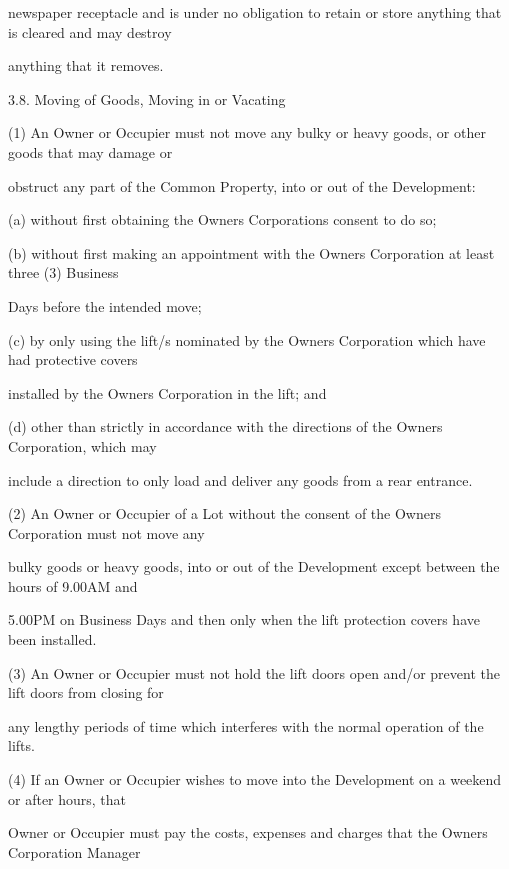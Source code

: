 \documentclass{article}
\begin{document}
{\fontsize{10.02}{1}newspaper receptacle and is under no obligation to retain or store anything that is cleared and may destroy }

{\fontsize{10.02}{1}anything that it removes. }

{\fontsize{9.99}{1}3.8. Moving of Goods, Moving in or Vacating }

{\fontsize{9.962}{1}(1) An Owner or Occupier must not move any bulky or heavy goods, or other goods that may damage or }

{\fontsize{10.02}{1}obstruct any part of the Common Property, into or out of the Development: }

{\fontsize{9.962}{1}(a) without first obtaining the Owners Corporations consent to do so; }

{\fontsize{9.962}{1}(b) without first making an appointment with the Owners Corporation at least three (3) Business }

{\fontsize{10.02}{1}Days before the intended move; }

{\fontsize{9.962}{1}(c) by only using the lift/s nominated by the Owners Corporation which have had protective covers }

{\fontsize{10.02}{1}installed by the Owners Corporation in the lift; and }

{\fontsize{9.962}{1}(d) other than strictly in accordance with the directions of the Owners Corporation, which may }

{\fontsize{10.02}{1}include a direction to only load and deliver any goods from a rear entrance. }

{\fontsize{9.962}{1}(2) An Owner or Occupier of a Lot without the consent of the Owners Corporation must not move any }

{\fontsize{10.02}{1}bulky goods or heavy goods, into or out of the Development except between the hours of 9.00AM and }

{\fontsize{10.02}{1}5.00PM on Business Days and then only when the lift protection covers have been installed. }

{\fontsize{9.962}{1}(3) An Owner or Occupier must not hold the lift doors open and/or prevent the lift doors from closing for }

{\fontsize{10.02}{1}any lengthy periods of time which interferes with the normal operation of the lifts. }

{\fontsize{9.962}{1}(4) If an Owner or Occupier wishes to move into the Development on a weekend or after hours, that }

{\fontsize{10.02}{1}Owner or Occupier must pay the costs, expenses and charges that the Owners Corporation Manager }
\end{document}

